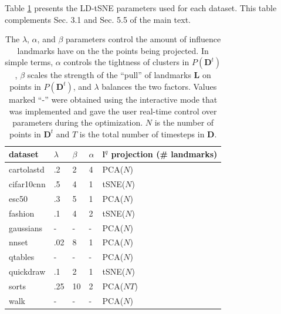 Table \ref{tab:ld-params} presents the LD-tSNE parameters used for each dataset. This table complements Sec. 3.1 and Sec. 5.5 of the main text. 

\begin{table}[ht!]
  \centering
  \selectfont
  \scriptsize
  \begin{tabular}{|l|l|l|l|l|}
    \hline
  dataset    & $\lambda$ & $\beta$ & $\alpha$ & $\mathbf{l}^q$ projection (\# landmarks) \\ \hline
  \hline
  cartolastd & .2     & 2  & 4  & PCA($N$)                 \\ \hline
  cifar10cnn & .5     & 4  & 1  & tSNE($N$)               \\ \hline
  esc50      & .3     & 5  & 1  & PCA($N$)                 \\ \hline
  fashion    & .1     & 4  & 2  & tSNE($N$)               \\ \hline
  gaussians  & -      & -  & -  & PCA($N$)                 \\ \hline
  nnset      & .02    & 8  & 1  & PCA($N$)                 \\ \hline
  qtables    & -      & -  & -  & PCA($N$)                 \\ \hline
  quickdraw  & .1     & 2  & 1  & tSNE($N$)               \\ \hline
  sorts      & .25    & 10 & 2  & PCA($NT$)               \\ \hline
  walk       & -      & -  & -  & PCA($N$)                 \\ \hline
  \end{tabular}
  \caption{The $\lambda$, $\alpha$, and $\beta$ parameters control the amount of influence landmarks have on the the points being projected. In simple terms, $\alpha$ controls the tightness of clusters in $P(\mathbf{D}^t)$, $\beta$ scales the strength of the ``pull'' of landmarks $\mathbf{L}$ on points in $P(\mathbf{D}^t)$, and $\lambda$ balances the two factors. 
  Values marked ``-'' were obtained using the interactive mode that was implemented and gave the user real-time control over parameters during the optimization. $N$ is the number of points in $\mathbf{D}^t$ and $T$ is the total number of timesteps in $\mathbf{D}$.}
  \label{tab:ld-params}
\end{table}


